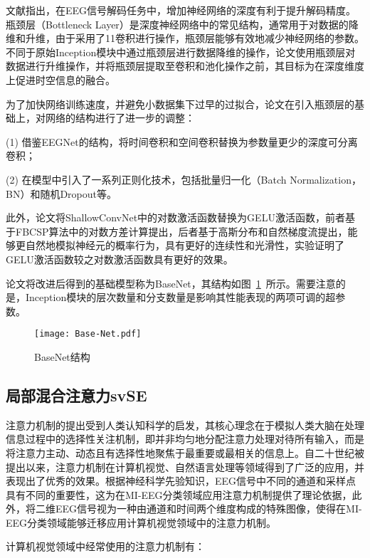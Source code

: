 文献\cite{lawhern2018eegnet}\cite{schirrmeister2017deep}指出，在EEG信号解码任务中，增加神经网络的深度有利于提升解码精度。瓶颈层（Bottleneck Layer）是深度神经网络中的常见结构\cite{he2016deep}\cite{huang2017densely}，通常用于对数据的降维和升维，由于采用了1\times1卷积进行操作，瓶颈层能够有效地减少神经网络的参数。不同于原始Inception模块中通过瓶颈层进行数据降维的操作，论文使用瓶颈层对数据进行升维操作，并将瓶颈层提取至卷积和池化操作之前，其目标为在深度维度上促进时空信息的融合。

为了加快网络训练速度，并避免小数据集下过早的过拟合，论文在引入瓶颈层的基础上，对网络的结构进行了进一步的调整：

(1) 借鉴EEGNet\cite{lawhern2018eegnet}的结构，将时间卷积和空间卷积替换为参数量更少的深度可分离卷积\cite{lawhern2018eegnet}；

(2) 在模型中引入了一系列正则化技术，包括批量归一化（Batch Normalization，BN）和随机Dropout等。

此外，论文将ShallowConvNet中的对数激活函数替换为GELU激活函数，前者基于FBCSP算法中的对数方差计算提出，后者基于高斯分布和自然梯度流提出，能够更自然地模拟神经元的概率行为，具有更好的连续性和光滑性\cite{hendrycks2016gaussian}，实验证明了GELU激活函数较之对数激活函数具有更好的效果。

论文将改进后得到的基础模型称为BaseNet，其结构如图~\ref{fig:BaseNet}~所示。需要注意的是，Inception模块的层次数量和分支数量是影响其性能表现的两项可调的超参数。
\begin{figure}
    \centering
    \texttt{[image: Base-Net.pdf]}
    \caption{BaseNet结构}
    \label{fig:BaseNet}
\end{figure}

\subsection{局部混合注意力svSE}

注意力机制的提出受到人类认知科学的启发，其核心理念在于模拟人类大脑在处理信息过程中的选择性关注机制，即并非均匀地分配注意力处理对待所有输入，而是将注意力主动、动态且有选择性地聚焦于最重要或最相关的信息上。自二十世纪被提出以来\cite{730558}，注意力机制在计算机视觉、自然语言处理等领域得到了广泛的应用，并表现出了优秀的效果。根据神经科学先验知识，EEG信号中不同的通道和采样点具有不同的重要性，这为在MI-EEG分类领域应用注意力机制提供了理论依据，此外，将二维EEG信号视为一种由通道和时间两个维度构成的特殊图像，使得在MI-EEG分类领域能够迁移应用计算机视觉领域中的注意力机制。

计算机视觉领域中经常使用的注意力机制有：

